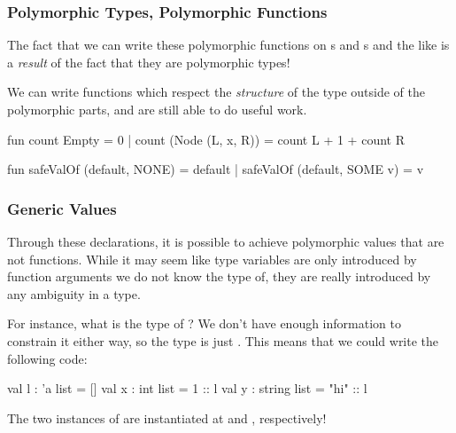 \documentclass[aspectratio=169]{beamer}
\begin{document}
\begin{frame}[fragile]
  \frametitle{Polymorphic Types, Polymorphic Functions}

  The fact that we can write these polymorphic functions on s and
  s and the like is a \textit{result} of the fact that they are
  polymorphic types!

  \pause
  \vspace{\fill}

  We can write functions which respect the \textit{structure} of the type
  outside of the polymorphic parts, and are still able to do useful work.

  \pause
  \vspace{\fill}

  \begin{codeblock}
    fun count Empty = 0
      | count (Node (L, x, R)) = count L + 1 + count R

    fun safeValOf (default, NONE)   = default
      | safeValOf (default, SOME v) = v
  \end{codeblock}
\end{frame}

\begin{frame}[fragile]
  \frametitle{Generic Values}

  Through these declarations, it is possible to achieve polymorphic values that
  are not functions. While it may seem like type variables are only introduced
  by function arguments we do not know the type of, they are really introduced by
  any ambiguity in a type.

  \pause
  \vspace{\fill}

  For instance, what is the type of \code{[]}? We don't have enough information
  to constrain it either way, so the type is just . This means that
  we could write the following code:

  \pause
  \vspace{\fill}

  \begin{codeblock}
    val l : 'a list = []
    val x : int list = 1 :: l
    val y : string list = "hi" :: l
  \end{codeblock}

  \pause
  The two instances of  are instantiated at  and
  , respectively!
\end{frame}
\end{document}
